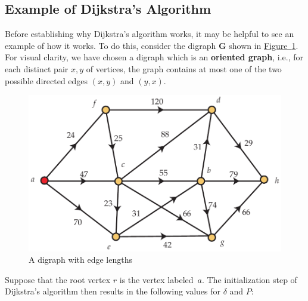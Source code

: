 \documentclass[10pt,]{book}
\newcommand{\terminology}[1]{\textbf{#1}}
\theoremstyle{plain}
\theoremstyle{definition}
\theoremstyle{definition}
\theoremstyle{definition}
\theoremstyle{definition}
\numberwithin{equation}{section}
\newcommand{\bfG}{\mathbf{G}}
\begin{document}
\typeout{************************************************}
\typeout{************************************************}
\subsection[{Example of Dijkstra's Algorithm}]{Example of Dijkstra's Algorithm}\label{subsection-24}
\hypertarget{p-206}{}%
Before establishing why Dijkstra's algorithm works, it may be helpful to see an example of how it works. To do this, consider the digraph \(\bfG\) shown in \hyperref[fig_graphalgorithms_dijkstragraph]{Figure~\ref{fig_graphalgorithms_dijkstragraph}}. For visual clarity, we have chosen a digraph which is an \terminology{oriented graph}, i.e.\@, for each distinct pair \(x,y\) of vertices, the graph contains at most one of the two possible directed edges \((x,y)\) and \((y,x)\).%
\begin{figure}
\centering
\includegraphics[width=0.85\linewidth]{images/dijkstragraph}
\caption{A digraph with edge lengths\label{fig_graphalgorithms_dijkstragraph}}
\end{figure}
\hypertarget{p-207}{}%
Suppose that the root vertex \(r\) is the vertex labeled~\(a\). The initialization step of Dijkstra's algorithm then results in the following values for \(\delta\) and \(P\):%
\typeout{************************************************}
\typeout{************************************************}
\end{document}
